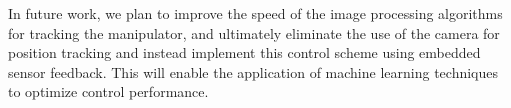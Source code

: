 In future work, we plan to improve the speed of the image processing algorithms for tracking the manipulator, and ultimately eliminate the use of the camera for position tracking and instead implement this control scheme using embedded sensor feedback.  This will enable the application of machine learning techniques to optimize control performance.

